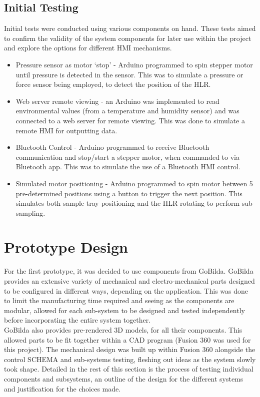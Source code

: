 \documentclass{UoNMCHA}
\numberwithin{equation}{section}
\begin{document}
\subsection{Initial Testing}\label{sub:Initial Testing}
Initial tests were conducted using various components on hand. These tests aimed to confirm the validity of the system components for later use within the project and explore the options for different HMI mechanisms.\\
\begin{itemize}
	\item Pressure sensor as motor ‘stop’ - Arduino programmed to spin stepper motor until pressure is detected in the sensor. This was to simulate a pressure or force sensor being employed, to detect the position of the HLR.
	\item Web server remote viewing - an Arduino was implemented to read environmental values (from a temperature and humidity sensor) and was connected to a web server for remote viewing. This was done to simulate a remote HMI for outputting data. 
	\item Bluetooth Control - Arduino programmed to receive Bluetooth communication and stop/start a stepper motor, when commanded to via  Bluetooth app. This was to simulate the use of a Bluetooth HMI control.
	\item Simulated motor positioning - Arduino programmed to spin motor between 5 pre-determined positions using a button to trigger the next position. This simulates both sample tray positioning and the HLR rotating to perform sub-sampling. 
\end{itemize}
\newpage
\section{Prototype Design}\label{sec:Prototype Design}
For the first prototype, it was decided to use components from GoBilda. GoBilda provides an extensive variety of mechanical and electro-mechanical parts designed to be configured in different ways, depending on the application. This was done to limit the manufacturing time required and seeing as the components are modular, allowed for each sub-system to be designed and tested independently before incorporating the entire system together.\\
GoBilda also provides pre-rendered 3D models, for all their components. This allowed parts to be fit together within a CAD program (Fusion 360 was used for this project). The mechanical design was built up within Fusion 360 alongside the control SCHEMA and sub-systems testing, fleshing out ideas as the system slowly took shape.\newline
Detailed in the rest of this section is the process of testing individual components and subsystems, an outline of the design for the different systems and justification for the choices made.\\
\end{document}

